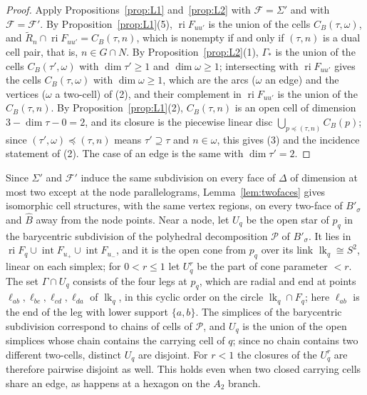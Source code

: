 \begin{proof}
Apply Propositions~\ref{prop:L1} and~\ref{prop:L2} with $\mathcal F=\Sigma'$ and with $\mathcal F=\mathcal F'$. By
Proposition~\ref{prop:L1}(5), $\operatorname{ri}F_{uu'}$ is the union of the cells $C_B(\tau,\omega)$, and
$\widetilde R_n\cap\operatorname{ri}F_{uu'}=C_B(\tau,n)$, which is nonempty if and only if $(\tau,n)$ is a dual cell pair, that
is, $n\in G\cap N$. By Proposition~\ref{prop:L2}(1), $\Gamma_*$ is the union of the cells $C_B(\tau',\omega)$ with
$\dim\tau'\ge1$ and $\dim\omega\ge1$; intersecting with $\operatorname{ri}F_{uu'}$ gives the cells $C_B(\tau,\omega)$ with
$\dim\omega\ge1$, which are the arcs ($\omega$ an edge) and the vertices ($\omega$ a two-cell) of (2), and their complement
in $\operatorname{ri}F_{uu'}$ is the union of the $C_B(\tau,n)$. By Proposition~\ref{prop:L1}(2), $C_B(\tau,n)$ is an open
cell of dimension $3-\dim\tau-0=2$, and its closure is the piecewise linear disc $\bigcup_{p\preceq(\tau,n)}C_B(p)$; since
$(\tau',\omega)\preceq(\tau,n)$ means $\tau'\supseteq\tau$ and $n\in\omega$, this gives (3) and the incidence statement of
(2). The case of an edge is the same with $\dim\tau'=2$.
\end{proof}

Since $\Sigma'$ and $\mathcal F'$ induce the same subdivision on every face of $\Delta$ of dimension at most two except at
the node parallelograms, Lemma~\ref{lem:twofaces} gives isomorphic cell structures, with the same vertex regions, on
every two-face of $B'_\sigma$ and $\widehat B$ away from the node points. Near a node, let $U_q$ be the open star of $p_q$ in
the barycentric subdivision of the polyhedral decomposition $\mathscr P$ of $B'_\sigma$. It lies in
$\operatorname{ri}F_q\cup\operatorname{int}F_{u_+}\cup\operatorname{int}F_{u_-}$, and it is the open cone from $p_q$ over its
link $\operatorname{lk}_q\cong S^2$, linear on each simplex; for $0<r\le1$ let $U^r_q$ be the part of cone parameter $<r$.
The set $\Gamma\cap U_q$ consists of the four legs at $p_q$, which are radial and end at points
$\ell_{ab},\ell_{bc},\ell_{cd},\ell_{da}$ of $\operatorname{lk}_q$, in this cyclic order on the circle
$\operatorname{lk}_q\cap F_q$; here $\ell_{ab}$ is the end of the leg with lower support $\{a,b\}$. The simplices of the
barycentric subdivision correspond to chains of cells of $\mathscr P$, and $U_q$ is the union of the open simplices whose
chain contains the carrying cell of $q$; since no chain contains two different two-cells, distinct $U_q$ are disjoint. For
$r<1$ the closures of the $U^r_q$ are therefore pairwise disjoint as well. This holds even when two closed carrying cells
share an edge, as happens at a hexagon on the $A_2$ branch.

